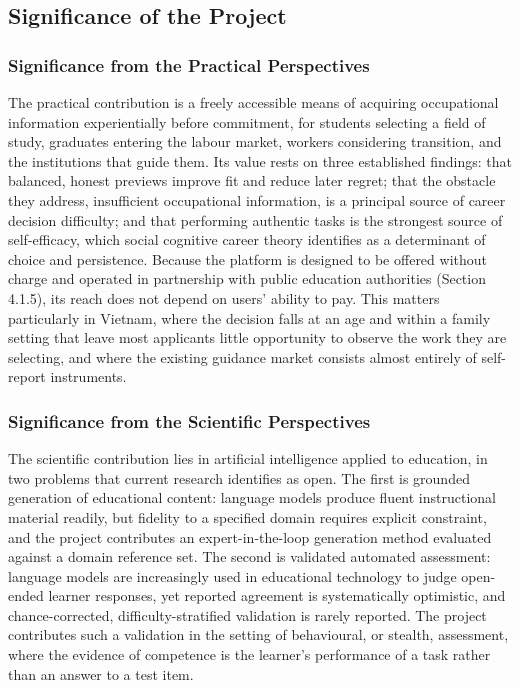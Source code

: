 \subsection{Significance of the Project}

\subsubsection{Significance from the Practical Perspectives}

The practical contribution is a freely accessible means of acquiring occupational information experientially before commitment, for students selecting a field of study, graduates entering the labour market, workers considering transition, and the institutions that guide them. Its value rests on three established findings: that balanced, honest previews improve fit and reduce later regret\cite{r8,r9}; that the obstacle they address, insufficient occupational information, is a principal source of career decision difficulty\cite{r1,r2}; and that performing authentic tasks is the strongest source of self-\allowbreak{}efficacy, which social cognitive career theory identifies as a determinant of choice and persistence\cite{r10,r11}. Because the platform is designed to be offered without charge and operated in partnership with public education authorities (Section 4.1.5), its reach does not depend on users' ability to pay. This matters particularly in Vietnam, where the decision falls at an age and within a family setting that leave most applicants little opportunity to observe the work they are selecting, and where the existing guidance market consists almost entirely of self-report instruments.

\subsubsection{Significance from the Scientific Perspectives}

The scientific contribution lies in artificial intelligence applied to education, in two problems that current research identifies as open. The first is grounded generation of educational content: language models produce fluent instructional material readily, but fidelity to a specified domain requires explicit constraint, and the project contributes an expert-\allowbreak{}in-\allowbreak{}the-\allowbreak{}loop generation method evaluated against a domain reference set. The second is validated automated assessment: language models are increasingly used in educational technology to judge open-ended learner responses, yet reported agreement is systematically optimistic, and chance-\allowbreak{}corrected, difficulty-\allowbreak{}stratified validation is rarely reported. The project contributes such a validation in the setting of behavioural, or stealth, assessment, where the evidence of competence is the learner's performance of a task rather than an answer to a test item.

